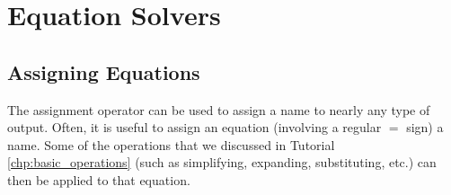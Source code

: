 \chapter{Equation Solvers}
\label{chp:equation_solvers}		

\section{Assigning Equations}

The assignment operator \text{:=} can be used to assign a name to nearly any type of output. Often, it is useful to assign an equation (involving a regular $=$ sign) a name. Some of the operations that we discussed in Tutorial \ref{chp:basic_operations} (such as simplifying, expanding, substituting, etc.) can then be applied to that equation.


\begin{maplegroup}
\begin{mapleinput}
\end{mapleinput}
\mapleresult
\begin{maplelatex}
\end{maplelatex}
\end{maplegroup}


\begin{maplegroup}
\begin{mapleinput}
\end{mapleinput}
\mapleresult
\begin{maplelatex}
\end{maplelatex}
\end{maplegroup}

\begin{maplegroup}
\begin{mapleinput}
\end{mapleinput}
\mapleresult
\begin{maplelatex}
\end{maplelatex}
\end{maplegroup}

